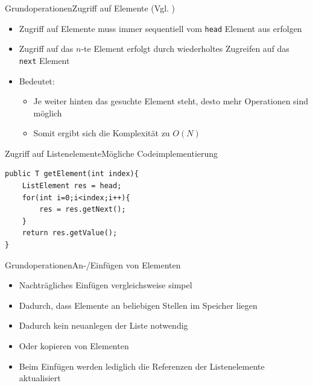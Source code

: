 \begin{frame}{Grundoperationen}{Zugriff auf Elemente (Vgl. \cite{fahr:list})}
	\begin{itemize}
		\item Zugriff auf Elemente muss immer sequentiell vom \texttt{head} Element aus erfolgen
		\item Zugriff auf das $n$-te Element erfolgt durch wiederholtes Zugreifen auf das \texttt{next} Element
		\item Bedeutet:
		\begin{itemize}
			\item Je weiter hinten das gesuchte Element steht, desto mehr Operationen sind möglich
			\item Somit ergibt sich die Komplexität zu $O(N)$
		\end{itemize}
	\end{itemize}
\end{frame}

\begin{frame}[fragile]{Zugriff auf Listenelemente}{Mögliche Codeimplementierung}
\lstset{style=java}
\begin{lstlisting}
public T getElement(int index){
    ListElement res = head;
    for(int i=0;i<index;i++){
        res = res.getNext();
    }
    return res.getValue();
}
\end{lstlisting}
\end{frame}

\begin{frame}{Grundoperationen}{An-/Einfügen von Elementen}
	\begin{itemize}
		\item Nachträgliches Einfügen vergleichsweise simpel
		\item Dadurch, dass Elemente an beliebigen Stellen im Speicher liegen
		\item Dadurch kein neuanlegen der Liste notwendig
		\item Oder kopieren von Elementen
		\item Beim Einfügen werden lediglich die Referenzen der Listenelemente aktualisiert
	\end{itemize}
\end{frame}

